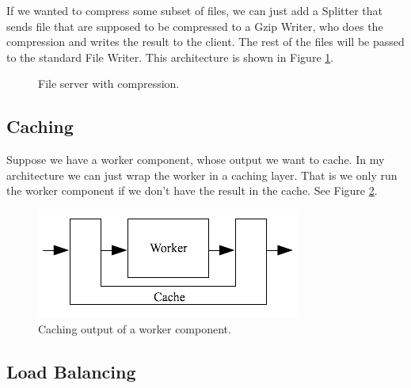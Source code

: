 \documentclass[12pt,a4paper]{article}
\begin{document}
If we wanted to compress some subset of files, we can just add a Splitter
that sends file that are supposed to be compressed to a Gzip Writer, who
does the compression and writes the result to the client. The rest of the files
will be passed to the standard File Writer. This architecture is shown in
Figure \ref{fig:fileServer2}.

\begin{figure}[h]
\centering
{}
\caption[scale=1.0]{File server with compression.}
\label{fig:fileServer2}
\end{figure}

\subsection{Caching}
Suppose we have a worker component, whose output we want to cache.
In my architecture we can just wrap the worker in a caching layer.
That is we only run the worker component if we don't have the result
in the cache. See Figure \ref{fig:caching}.

\begin{figure}[h]
\centering
\includegraphics{caching}
\caption[scale=1.0]{Caching output of a worker component.}
\label{fig:caching}
\end{figure}

\subsection{Load Balancing}
\end{document}
